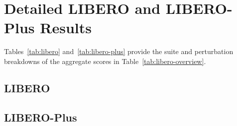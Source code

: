 \section{Detailed LIBERO and LIBERO-Plus Results}
\label{appendix:benchmark-details}

Tables~\ref{tab:libero} and~\ref{tab:libero-plus} provide the suite and
perturbation breakdowns of the aggregate scores in
Table~\ref{tab:libero-overview}.

\subsection{LIBERO}
\label{appendix:libero}

%

\subsection{LIBERO-Plus}
\label{appendix:libero-plus}

%

